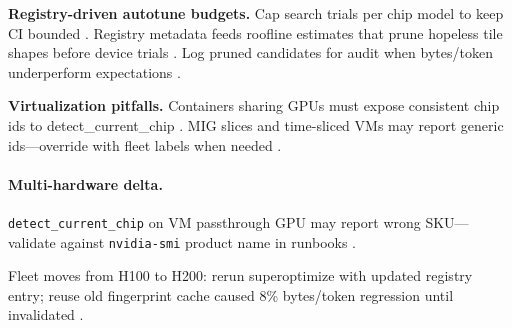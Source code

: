 \textbf{Registry-driven autotune budgets.} Cap search trials per chip model to keep CI bounded \citep{yirage2026,chen2020compilerbasedhardw,patel2025llminference,taxbreak2026,memoryfloor2026,dlbook,semianalysis2024tma,amd2024xdna,amd2024aie,kwon2023vllm,liu2024deepseekv3,nvidia2024cudagraphs,dao2022flashattention,dao2023flashdecoding,nvidia2022hopper,dlbook}. Registry metadata feeds roofline estimates that prune hopeless tile shapes before device trials \citep{memoryfloor2026,yirage2026,chen2020compilerbasedhardw,patel2025llminference,semianalysis2024tma,dlbook,taxbreak2026,kwon2023vllm,liu2024deepseekv3,nvidia2024cudagraphs,dao2022flashattention,amd2024aie,amd2024xdna,dao2023flashdecoding,nvidia2022hopper,dlbook}. Log pruned candidates for audit when bytes/token underperform expectations \citep{patel2025llminference,yirage2026,chen2020compilerbasedhardw,memoryfloor2026,taxbreak2026,dlbook}.

\textbf{Virtualization pitfalls.} Containers sharing GPUs must expose consistent chip ids to detect\_current\_chip \citep{patel2025llminference,yirage2026,chen2020compilerbasedhardw,kwon2023vllm,taxbreak2026,memoryfloor2026,dlbook,liu2024deepseekv3,nvidia2024cudagraphs,dao2022flashattention,semianalysis2024tma,amd2024xdna,amd2024aie,dao2023flashdecoding,nvidia2022hopper,dlbook}. MIG slices and time-sliced VMs may report generic ids---override with fleet labels when needed \citep{patel2025llminference,yirage2026,chen2020compilerbasedhardw,dlbook,taxbreak2026,memoryfloor2026,kwon2023vllm,nvidia2024cudagraphs,dao2022flashattention,liu2024deepseekv3,semianalysis2024tma,amd2024aie,amd2024xdna,dao2023flashdecoding,nvidia2022hopper,dlbook}.

\paragraph{Multi-hardware delta.} \texttt{detect\_current\_chip} on VM passthrough GPU may report wrong SKU---validate against \texttt{nvidia-smi} product name in runbooks \citep{patel2025llminference,yirage2026,chen2020compilerbasedhardw,semianalysis2024tma,nvidia2022hopper,dlbook,taxbreak2026,memoryfloor2026,kwon2023vllm,liu2024deepseekv3,nvidia2024cudagraphs,dao2022flashattention,amd2024aie,amd2024xdna,dao2023flashdecoding,dlbook}.

\begin{example}
Fleet moves from H100 to H200: rerun superoptimize with updated registry entry; reuse old fingerprint cache caused 8\% bytes/token regression until invalidated \citep{yirage2026,chen2020compilerbasedhardw,memoryfloor2026,taxbreak2026,patel2025llminference,semianalysis2024tma,nvidia2022hopper,dlbook}.
\end{example}

